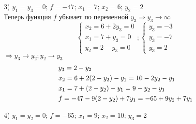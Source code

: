 \documentclass[12pt]{article}
\begin{document}
3) $y_1=y_3=0;\,f=-47;\,x_1=7;\,x_2=6;\,y_2=2$\\
Теперь функция $f$ убывает по переменной $y_3\Rightarrow y_3\to \infty$
\begin{equation}
  \begin{cases}
  x_2=6+2y_3=0\\
  x_1=7+y_3=0\\
  y_2=2-y_3=0
\end{cases};
\begin{cases}
  y_3=-3 \\
  y_3=-7\\
  y_3=2
\end{cases}
\end{equation}
$\Rightarrow y_3 \to y_2;y_2\to y_3$
\begin{align}
  &y_3=2-y_2\notag\\
  &x_2=6+2(2-y_2)-y_1=10-2y_2-y_1\\
  &x_1=7+(2-y_2)-y_1=9-y_2-y_1\notag\\
  &f=-47-9(2-y_2)+7y_1=-65+9y_2+7y_1\notag
\end{align}

4) $y_1=y_2=0;\,f=-65;\,x_1=9;\,x_2=10;\,y_3=2$
\end{document}
